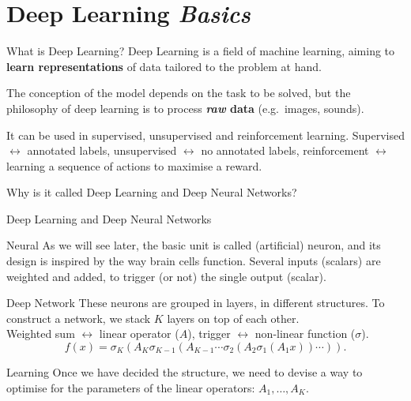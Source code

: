 \documentclass[aspectratio=169]{beamer}
\begin{document}
\section{Deep Learning \textit{Basics}}

\begin{frame}{What is Deep Learning?}
Deep Learning is a field of machine learning, aiming to \textbf{learn representations} of data tailored to the problem at hand.\vspace{3mm}

The conception of the model depends on the task to be solved, but the philosophy of deep learning is to process \textbf{\textit{raw} data} (e.g.\ images, sounds).\vspace{3mm}

It can be used in supervised, unsupervised and reinforcement learning. Supervised $\leftrightarrow$ annotated labels, unsupervised $\leftrightarrow$ no annotated labels, reinforcement $\leftrightarrow$ learning a sequence of actions to maximise a reward.\vspace{3mm}

Why is it called Deep Learning and Deep Neural Networks?

\end{frame}

\begin{frame}{Deep Learning and Deep Neural Networks}
 \begin{block}{Neural}
   As we will see later, the basic unit is called (artificial) neuron, and its design is inspired by the way brain cells function. Several inputs (scalars) are weighted and added, to trigger (or not) the single output (scalar).\\
 \end{block}
 \begin{block}{Deep Network}
   These neurons are grouped in layers, in different structures. To construct a network, we stack $K$ layers on top of each other.\vspace{3mm}\\
   Weighted sum $\leftrightarrow$ linear operator ($A$), trigger $\leftrightarrow$ non-linear function ($\sigma$).\vspace{-3mm}
   $$ f(x) = \sigma_K(A_K \sigma_{K-1}( A_{K-1} \cdots \sigma_2(A_2\sigma_1(A_1x))\cdots)). $$
 \end{block}
 \begin{block}{Learning}
  Once we have decided the structure, we need to devise a way to optimise for the parameters of the linear operators: $A_1,\ldots,A_K$.
 \end{block}
\end{frame}
\end{document}
